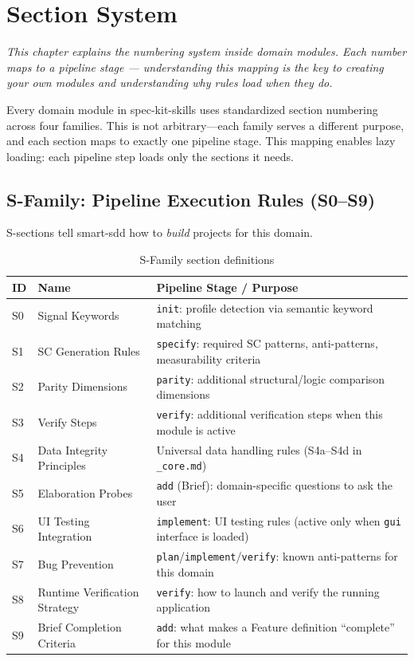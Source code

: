 \documentclass[11pt,a4paper,openright,twoside]{report}
\begin{document}
\chapter{Section System}
\label{ch:sections}

\textit{This chapter explains the numbering system inside domain modules. Each number maps to a pipeline stage --- understanding this mapping is the key to creating your own modules and understanding why rules load when they do.}

Every domain module in spec-kit-skills uses standardized section numbering across four families. This is not arbitrary---each family serves a different purpose, and each section maps to exactly one pipeline stage. This mapping enables lazy loading: each pipeline step loads only the sections it needs.

\section{S-Family: Pipeline Execution Rules (S0--S9)}

S-sections tell smart-sdd how to \emph{build} projects for this domain.

\begin{table}[H]
\centering
\caption{S-Family section definitions}
\label{tab:s-sections}
\begin{tabularx}{\textwidth}{llX}
\toprule
\textbf{ID} & \textbf{Name} & \textbf{Pipeline Stage / Purpose} \\
\midrule
S0 & Signal Keywords & \texttt{init}: profile detection via semantic keyword matching \\
S1 & SC Generation Rules & \texttt{specify}: required SC patterns, anti-patterns, measurability criteria \\
S2 & Parity Dimensions & \texttt{parity}: additional structural/logic comparison dimensions \\
S3 & Verify Steps & \texttt{verify}: additional verification steps when this module is active \\
S4 & Data Integrity Principles & Universal data handling rules (S4a--S4d in \texttt{\_core.md}) \\
S5 & Elaboration Probes & \texttt{add} (Brief): domain-specific questions to ask the user \\
S6 & UI Testing Integration & \texttt{implement}: UI testing rules (active only when \texttt{gui} interface is loaded) \\
S7 & Bug Prevention & \texttt{plan}/\texttt{implement}/\texttt{verify}: known anti-patterns for this domain \\
S8 & Runtime Verification Strategy & \texttt{verify}: how to launch and verify the running application \\
S9 & Brief Completion Criteria & \texttt{add}: what makes a Feature definition ``complete'' for this module \\
\bottomrule
\end{tabularx}
\end{table}
\end{document}
